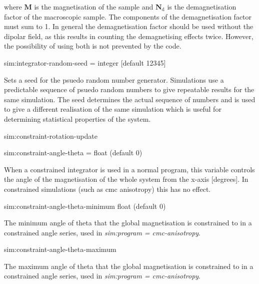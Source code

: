 \noindent where $\mathbf{M}$ is the magnetisation of the sample and $\mathbf{N}_{\mathrm{d}}
$ is the demagnetisation factor of the macroscopic sample. The components of the demagnetisation factor must sum to 1. In general the demagnetisation factor should be used without the dipolar field, as this results in counting the demagnetising effects twice. However, the possibility of using both is not prevented by the code.



{\zicf sim:integrator-random-seed = integer [default 12345]} Sets a seed for the psuedo random number generator. Simulations use a predictable sequence of psuedo random numbers to give repeatable results for the same simulation. The seed determines the actual sequence of numbers and is used to give a different realisation of the same simulation which is useful for determining statistical properties of the system.

{\zicf sim:constraint-rotation-update}

{\zicf sim:constraint-angle-theta = float (default 0)} When a constrained integrator is used in a normal program, this variable controls the angle of the magnetisation of the whole system from the x-axis [degrees]. In constrained simulations (such as cmc anisotropy) this has no effect.

{\zicf  sim:constraint-angle-theta-minimum float (default 0)}   The minimum angle of theta that the global magnetisation is constrained to in a constrained angle series, used in \textit{sim:program = cmc-anisotropy}.

{\zicf  sim:constraint-angle-theta-maximum} The maximum angle of theta that the global magnetisation is constrained to in a constrained angle series, used in \textit{sim:program = cmc-anisotropy}.

